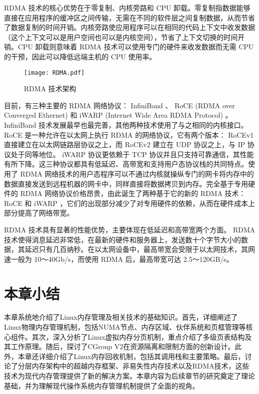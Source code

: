  RDMA 技术的核心优势在于零复制、内核旁路和 CPU 卸载。零复制指数据能够直接在应用程序的缓冲区之间传输，无需在不同的软件层之间复制数据，从而节省了数据复制的时间开销。内核旁路使应用程序可以在相同的代码上下文中收发数据（这个上下文可以是用户空间也可以是内核空间），节省了上下文切换的时间开销。CPU 卸载则意味着 RDMA 技术可以使用专门的硬件来收发数据而无需 CPU 的干预，因此可以降低远端主机的 CPU 使用率。

\begin{figure}[h]
    \centering
    \texttt{[image: RDMA.pdf]}
    \caption{RDMA 技术架构}
    \label{fig:RDMA}
\end{figure}

目前，有三种主要的 RDMA 网络协议： InfiniBand 、 RoCE (RDMA over Converged Ethernet) 和 iWARP (Internet Wide Area RDMA Protocol) 。 InfiniBand 技术发展最早也最完善，其他两种技术使用了与之相同的内核接口。 RoCE 是一种允许在以太网上执行 RDMA 的网络协议，它有两个版本： RoCEv1 直接建立在以太网链路层协议之上，而 RoCEv2 建立在 UDP 协议之上，与 IP 协议处于同等地位。 iWARP 协议更依赖于 TCP 协议并且只支持可靠通信，其性能有所下降。这三种协议都具有低延迟、高带宽和支持用户态协议栈的共同特点。使用了 RDMA 网络技术的用户态程序可以不通过内核就操纵专门的网卡将内存中的数据直接发送到远程机器的网卡中，同样直接将数据拷贝到内存。完全基于专用硬件的 RDMA 网络协议价格昂贵，由此诞生了两种基于它的新的 RDMA 技术： RoCE 和 iWARP ，它们的出现部分减少了对专用硬件的依赖，从而在硬件成本上部分提高了网络带宽。

 RDMA 技术具有显著的性能优势，主要体现在低延迟和高带宽两个方面。 RDMA 技术使得消息延迟非常低，在最新的硬件和服务器上，发送数十个字节大小的数据，其延迟只有几百纳秒。在以太网设备中，最高带宽会受限于以太网技术，其网速一般为 10～40Gb/s，而使用 RDMA 后，最高带宽可达 2.5～120GB/s。

\section{本章小结}

本章系统地介绍了Linux内存管理及相关技术的基础知识。首先，详细阐述了Linux物理内存管理机制，包括NUMA节点、内存区域、伙伴系统和页框管理等核心组件。其次，深入分析了Linux虚拟内存分页机制，重点介绍了多级页表结构及其工作原理。随后，探讨了CGroup V2在资源隔离和限制方面的创新设计。此外，本章还详细介绍了Linux内存回收机制，包括其调用栈和主要策略。最后，讨论了分层内存架构中的超越内存框架、非易失性内存技术以及RDMA技术，这些技术为现代内存管理提供了新的解决方案。本章内容为后续章节的研究奠定了理论基础，并为理解现代操作系统内存管理机制提供了全面的视角。